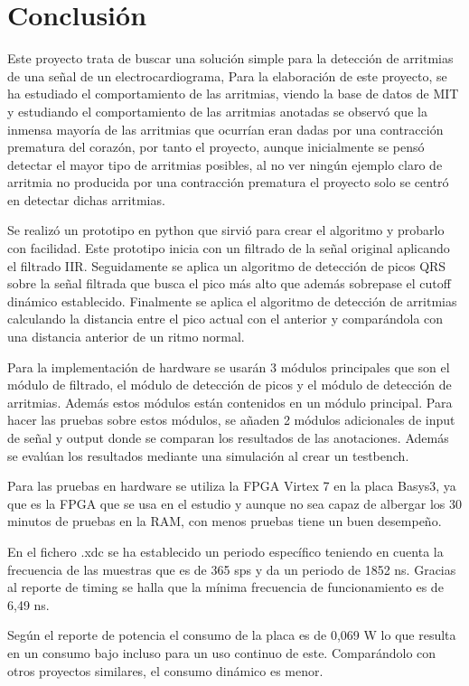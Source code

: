 \chapter*{Conclusión}
Este proyecto trata de buscar una solución simple para la detección de 
arritmias de una señal de un electrocardiograma, Para la elaboración de este proyecto, 
se ha estudiado el comportamiento de las arritmias, viendo la base de datos de MIT y estudiando
el comportamiento de las arritmias anotadas se observó que la inmensa mayoría de las arritmias 
que ocurrían eran dadas por una contracción prematura del corazón, por tanto el proyecto, aunque
inicialmente se pensó detectar el mayor tipo de arritmias posibles, al no ver ningún ejemplo claro
de arritmia no producida por una contracción prematura el proyecto solo se centró en detectar dichas arritmias.

Se realizó un prototipo en python que sirvió para crear el algoritmo y probarlo con facilidad. Este prototipo inicia
con un filtrado de la señal original aplicando el filtrado IIR. Seguidamente se aplica un algoritmo de detección de 
picos QRS sobre la señal filtrada que busca el pico más alto que además sobrepase el cutoff dinámico establecido. Finalmente
se aplica el algoritmo de detección de arritmias calculando la distancia entre el pico actual con el anterior y comparándola con una
distancia anterior de un ritmo normal.

Para la implementación de hardware se usarán 3 módulos principales que son el módulo de filtrado, el módulo de detección de picos 
y el módulo de detección de arritmias. Además estos módulos están contenidos en un módulo principal. Para hacer las pruebas sobre
estos módulos, se añaden 2 módulos adicionales de input de señal y output donde se comparan los resultados de las anotaciones. Además 
se evalúan los resultados mediante una simulación al crear un testbench.

Para las pruebas en hardware se utiliza la FPGA Virtex 7 en la placa Basys3, ya que es la FPGA que se usa en el estudio y aunque no sea capaz de 
albergar los 30 minutos de pruebas en la RAM, con menos pruebas tiene un buen desempeño.

En el fichero .xdc se ha establecido un periodo específico teniendo en cuenta la frecuencia de las muestras que es de 365 sps y da un periodo 
de 1852 ns. Gracias al reporte de timing se halla que la mínima frecuencia de funcionamiento es de 6,49 ns.

Según el reporte de potencia el consumo de la placa es de 0,069 W lo que resulta en un consumo bajo incluso para un uso continuo de este.
Comparándolo con otros proyectos similares, el consumo dinámico es menor.

